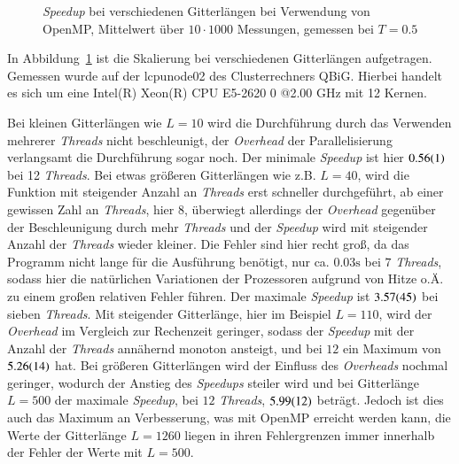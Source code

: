 	\begin{figure}[htbp]
		
		\caption[\textit{Speedup} bei verschiedenen Gitterlängen bei Verwendung von OpenMP]{\textit{Speedup}  bei verschiedenen Gitterlängen bei Verwendung von OpenMP, Mittelwert über $10 \cdot 1000$ Messungen, gemessen bei $T=\num{0,5}$}
		\label{fig:skalierunglaenge}
	\end{figure}
	
	In Abbildung~\ref{fig:skalierunglaenge} ist die Skalierung bei verschiedenen Gitterlängen aufgetragen. Gemessen wurde auf der lcpunode02 des Clusterrechners QBiG. Hierbei handelt es sich um eine Intel(R) Xeon(R) CPU E5-2620 0 @2.00 GHz mit 12 Kernen.%
	
	Bei kleinen Gitterlängen wie $L=10$ wird die Durchführung durch das Verwenden mehrerer \textit{Threads} nicht beschleunigt, der \textit{Overhead} der Parallelisierung verlangsamt die Durchführung sogar noch. Der minimale \textit{Speedup} ist hier $\num{0,56\pm0,01}$ bei 12 \textit{Threads}. Bei etwas größeren Gitterlängen wie z.{}B.{} $L=40$, wird die Funktion mit steigender Anzahl an \textit{Threads} erst schneller durchgeführt, ab einer gewissen Zahl an \textit{Threads}, hier $8$, überwiegt allerdings der \textit{Overhead} gegenüber der Beschleunigung durch mehr \textit{Threads} und der \textit{Speedup} wird mit steigender Anzahl der \textit{Threads} wieder kleiner. Die Fehler sind hier recht groß, da das Programm nicht lange für die Ausführung benötigt, nur ca.{} $\num{0,03}\si{\second}$ bei $7$ \textit{Threads}, sodass hier die natürlichen Variationen der Prozessoren aufgrund von Hitze o.{}Ä.{} zu einem großen relativen Fehler führen. Der maximale \textit{Speedup} ist $\num{3,57\pm0,45}$ bei sieben \textit{Threads}. Mit steigender Gitterlänge, hier im Beispiel $L=110$, wird der \textit{Overhead} im Vergleich zur Rechenzeit geringer, sodass der \textit{Speedup} mit der Anzahl der \textit{Threads} annähernd monoton ansteigt, und bei $12$ ein Maximum von $\num{5,26\pm0,14}$ hat.
	Bei größeren Gitterlängen wird der Einfluss des \textit{Overheads} nochmal geringer, wodurch der Anstieg des \textit{Speedups} steiler wird und bei Gitterlänge $L=500$ der maximale \textit{Speedup}, bei $12$ \textit{Threads}, $\num{5,99\pm0,12}$ beträgt. Jedoch ist dies auch das Maximum an Verbesserung, was mit OpenMP erreicht werden kann, die Werte der Gitterlänge $L=1260$ liegen in ihren Fehlergrenzen immer innerhalb der Fehler der Werte mit $L=500$.
 	
	
